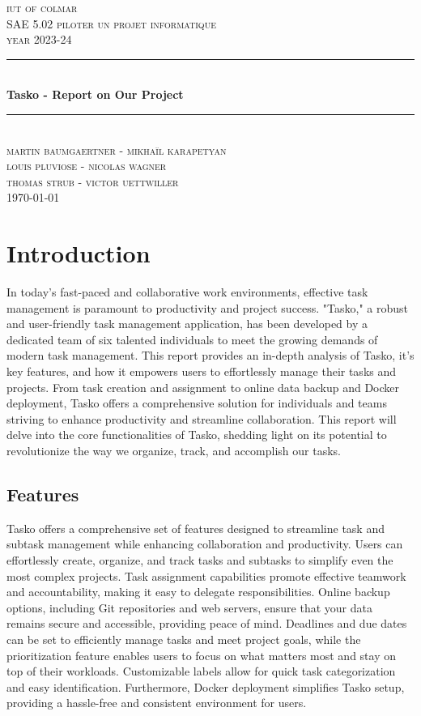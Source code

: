 \documentclass[12pt, a4paper]{article}
\begin{document}
\begin{titlepage}
	\newcommand{\HRule}{\rule{\linewidth}{0.5mm}} 
	\center 
	\textsc{\LARGE iut of colmar}\\[6.5cm] 
	\textsc{\Large SAE 5.02 piloter un projet informatique}\\[0.5cm] 
	\textsc{\large year 2023-24}\\[0.5cm]
	\HRule\\[0.75cm]
	{\Large\bfseries Tasko - Report on Our Project}\\[0.4cm]
	\HRule\\[0.5cm]
	\textsc{\large martin baumgaertner - mikhaïl karapetyan\\louis pluviose - nicolas wagner\\thomas strub - victor uettwiller}\\[6cm] 

	\vfill\vfill\vfill
	{\large\today} 
	\vfill
\end{titlepage}
\newpage
\tableofcontents
\listoffigures
\newpage
\section{Introduction}
In today's fast-paced and collaborative work 
environments, effective task management is paramount 
to productivity and project success. "Tasko," a 
robust and user-friendly task management application, 
has been developed by a dedicated team of six talented 
individuals to meet the growing demands of modern task 
management. This report provides an in-depth analysis 
of Tasko, it's key features, and how it empowers users 
to effortlessly manage their tasks and projects. From 
task creation and assignment to online data backup and 
Docker deployment, Tasko offers a comprehensive 
solution for individuals and teams striving to enhance 
productivity and streamline collaboration. This 
report will delve into the core functionalities of 
Tasko, shedding light on its potential to revolutionize 
the way we organize, track, and accomplish our tasks.

\subsection{Features}
Tasko offers a comprehensive set of features designed 
to streamline task and subtask management while 
enhancing collaboration and productivity. Users 
can effortlessly create, organize, and track 
tasks and subtasks to simplify even the most 
complex projects. Task assignment capabilities 
promote effective teamwork and accountability, 
making it easy to delegate responsibilities. 
Online backup options, including Git repositories 
and web servers, ensure that your data remains 
secure and accessible, providing peace of mind. 
Deadlines and due dates can be set to efficiently 
manage tasks and meet project goals, while the 
prioritization feature enables users to focus on 
what matters most and stay on top of their workloads. 
Customizable labels allow for quick task categorization 
and easy identification. Furthermore, Docker deployment 
simplifies Tasko setup, providing a hassle-free and 
consistent environment for users.
\end{document}
